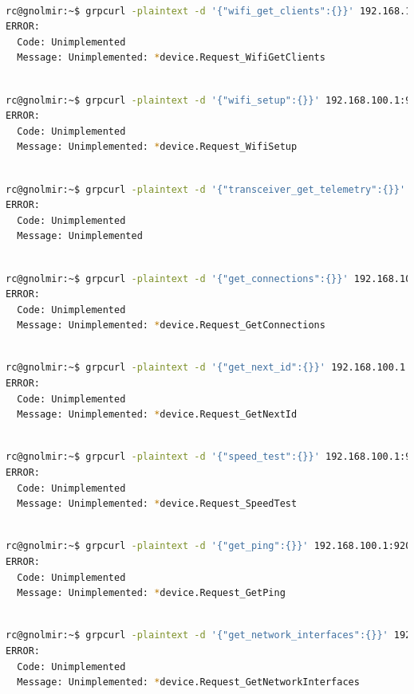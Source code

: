 \documentclass[IN,11pt,twoside,openright,bachelor,english]{tumthesis}
\begin{document}
\begin{lstlisting}[language=bash,basicstyle=\tiny]

rc@gnolmir:~$ grpcurl -plaintext -d '{"wifi_get_clients":{}}' 192.168.100.1:9200 SpaceX.API.Device.Device/Handle
ERROR:
  Code: Unimplemented
  Message: Unimplemented: *device.Request_WifiGetClients
\end{lstlisting}
\begin{lstlisting}[language=bash,basicstyle=\tiny]

rc@gnolmir:~$ grpcurl -plaintext -d '{"wifi_setup":{}}' 192.168.100.1:9200 SpaceX.API.Device.Device/Handle
ERROR:
  Code: Unimplemented
  Message: Unimplemented: *device.Request_WifiSetup
\end{lstlisting}
\begin{lstlisting}[language=bash,basicstyle=\tiny]

rc@gnolmir:~$ grpcurl -plaintext -d '{"transceiver_get_telemetry":{}}' 192.168.100.1:9200 SpaceX.API.Device.Device/Handle
ERROR:
  Code: Unimplemented
  Message: Unimplemented
\end{lstlisting}
\begin{lstlisting}[language=bash,basicstyle=\tiny]

rc@gnolmir:~$ grpcurl -plaintext -d '{"get_connections":{}}' 192.168.100.1:9200 SpaceX.API.Device.Device/Handle
ERROR:
  Code: Unimplemented
  Message: Unimplemented: *device.Request_GetConnections
\end{lstlisting}
\begin{lstlisting}[language=bash,basicstyle=\tiny]

rc@gnolmir:~$ grpcurl -plaintext -d '{"get_next_id":{}}' 192.168.100.1:9200 SpaceX.API.Device.Device/Handle
ERROR:
  Code: Unimplemented
  Message: Unimplemented: *device.Request_GetNextId
\end{lstlisting}
\begin{lstlisting}[language=bash,basicstyle=\tiny]
  
rc@gnolmir:~$ grpcurl -plaintext -d '{"speed_test":{}}' 192.168.100.1:9200 SpaceX.API.Device.Device/Handle
ERROR:
  Code: Unimplemented
  Message: Unimplemented: *device.Request_SpeedTest
\end{lstlisting}
\begin{lstlisting}[language=bash,basicstyle=\tiny]
  
rc@gnolmir:~$ grpcurl -plaintext -d '{"get_ping":{}}' 192.168.100.1:9200 SpaceX.API.Device.Device/Handle
ERROR:
  Code: Unimplemented
  Message: Unimplemented: *device.Request_GetPing
\end{lstlisting}
\begin{lstlisting}[language=bash,basicstyle=\tiny]

rc@gnolmir:~$ grpcurl -plaintext -d '{"get_network_interfaces":{}}' 192.168.100.1:9200 SpaceX.API.Device.Device/Handle
ERROR:
  Code: Unimplemented
  Message: Unimplemented: *device.Request_GetNetworkInterfaces
\end{lstlisting}
\end{document}
